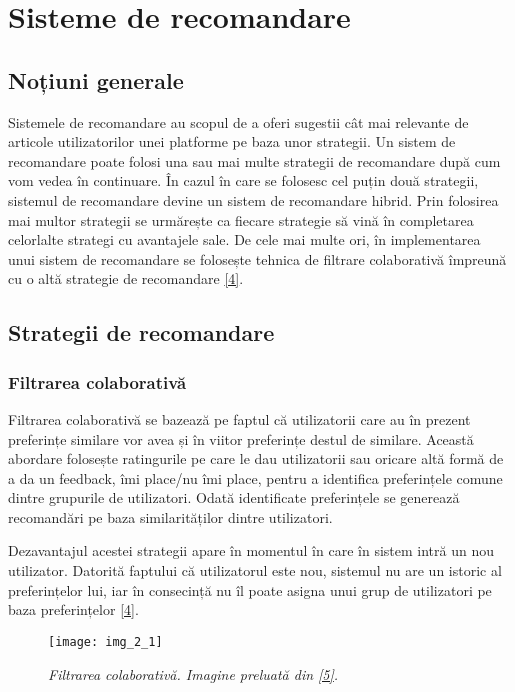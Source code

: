 \section{Sisteme de recomandare}

\subsection{Noțiuni generale}

Sistemele de recomandare au scopul de a oferi sugestii cât mai relevante de articole utilizatorilor unei platforme pe baza unor strategii. Un sistem de recomandare poate folosi una sau mai multe strategii de recomandare după cum vom vedea în continuare. În cazul în care se folosesc cel puțin două strategii, sistemul de recomandare devine un sistem de recomandare hibrid. Prin folosirea mai multor strategii se urmărește ca fiecare strategie să vină în completarea celorlalte strategi cu avantajele sale. De cele mai multe ori, în implementarea unui sistem de recomandare se folosește tehnica de filtrare colaborativă împreună cu o altă strategie de recomandare \hyperlink{ErionCanoMaurizioMorisio}{[4]}.

\subsection{Strategii de recomandare}

\subsubsection*{Filtrarea colaborativă}

Filtrarea colaborativă se bazează pe faptul că utilizatorii care au în prezent preferințe similare vor avea și în viitor preferințe destul de similare. Această abordare folosește ratingurile pe care le dau utilizatorii sau oricare altă formă de a da un feedback, îmi place/nu îmi place, pentru a identifica preferințele comune dintre grupurile de utilizatori. Odată identificate preferințele se generează recomandări pe baza similarităților dintre utilizatori. 

Dezavantajul acestei strategii apare în momentul în care în sistem intră un nou utilizator. Datorită faptului că utilizatorul este nou, sistemul nu are un istoric al preferințelor lui, iar în consecință nu îl poate asigna unui grup de utilizatori pe baza preferințelor \hyperlink{ErionCanoMaurizioMorisio}{[4]}.
\begin{figure}[!h]
	\centering
	\texttt{[image: img\_2\_1]}
	\caption[Filtrarea colaborativă]{\textit{Filtrarea colaborativă. Imagine preluată din \hyperlink{datameetsmedia}{[5]}.}}
\end{figure} 

